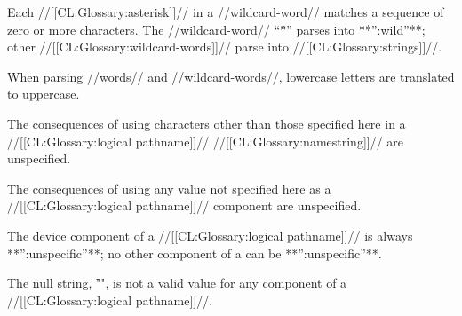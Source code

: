 \endsubsubsubsection%


Each //[[CL:Glossary:asterisk]]// in a //wildcard-word// matches a sequence of  zero or more characters.  The //wildcard-word// ``\f{*}''  parses into **'':wild''**; other //[[CL:Glossary:wildcard-words]]// parse into //[[CL:Glossary:strings]]//.
  \endsubsubsubsection%


When parsing //words// and //wildcard-words//, lowercase letters are translated to uppercase.

\endsubsubsubsection%


The consequences of using characters other than those specified here in a //[[CL:Glossary:logical pathname]]// //[[CL:Glossary:namestring]]// are unspecified.

The consequences of using any value not specified here as a  //[[CL:Glossary:logical pathname]]// component are unspecified.

\endsubsubsubsection%

\endsubsubsection%

\endSubsection%


 

The device component of a //[[CL:Glossary:logical pathname]]// is always **'':unspecific''**; no other component of a  can be **'':unspecific''**.  

\endsubsubsection%


The null string, \f{""}, is not a valid value for any component of a //[[CL:Glossary:logical pathname]]//.

\endsubsubsection%

\endSubsection%
